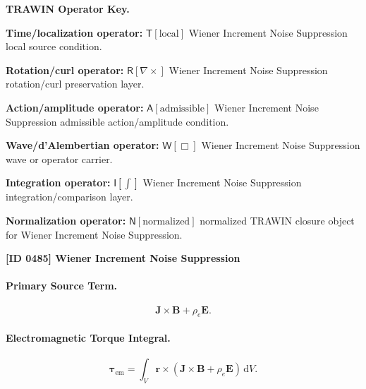 \par\vspace{0.45\baselineskip}
\noindent\begin{minipage}[t]{\linewidth}
\begingroup
\small
\raggedright
\textbf{TRAWIN Operator Key.}\par
\noindent\textbf{Time/localization operator:} $\mathsf{T}\!\left[\mathrm{local}\right]$ Wiener Increment Noise Suppression local source condition.\par
\noindent\textbf{Rotation/curl operator:} $\mathsf{R}\!\left[\nabla\times\right]$ Wiener Increment Noise Suppression rotation/curl preservation layer.\par
\noindent\textbf{Action/amplitude operator:} $\mathsf{A}\!\left[\mathrm{admissible}\right]$ Wiener Increment Noise Suppression admissible action/amplitude condition.\par
\noindent\textbf{Wave/d'Alembertian operator:} $\mathsf{W}\!\left[\Box\right]$ Wiener Increment Noise Suppression wave or operator carrier.\par
\noindent\textbf{Integration operator:} $\mathsf{I}\!\left[\int\right]$ Wiener Increment Noise Suppression integration/comparison layer.\par
\noindent\textbf{Normalization operator:} $\mathsf{N}\!\left[\mathrm{normalized}\right]$ normalized TRAWIN closure object for Wiener Increment Noise Suppression.\par
\endgroup
\end{minipage}

\clearpage
\noindent\textbf{[ID 0485] Wiener Increment Noise Suppression}\par
\vspace{0.35em}
\paragraph{Primary Source Term.}
\begin{equation}
\mathbf{J}\times\mathbf{B}
+
\rho_e\mathbf{E}.
\end{equation}

\paragraph{Electromagnetic Torque Integral.}
\begin{equation}
\boldsymbol{\tau}_{\mathrm{em}}
=
\int_V
\mathbf{r}\times
\left(
\mathbf{J}\times\mathbf{B}
+
\rho_e\mathbf{E}
\right)
\,\mathrm{d}V .
\end{equation}

